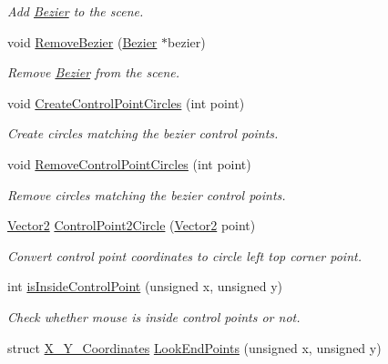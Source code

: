 \begin{DoxyCompactItemize}
\begin{DoxyCompactList}\small\item\em Add \mbox{\hyperlink{classBezier}{Bezier}} to the scene. \end{DoxyCompactList}\item 
void \mbox{\hyperlink{classOwnGraphicsScene_a24d8270608b0bd56c6155d99d7722ab8}{Remove\+Bezier}} (\mbox{\hyperlink{classBezier}{Bezier}} $\ast$bezier)
\begin{DoxyCompactList}\small\item\em Remove \mbox{\hyperlink{classBezier}{Bezier}} from the scene. \end{DoxyCompactList}\item 
void \mbox{\hyperlink{classOwnGraphicsScene_a0ad50d478944ef3200d1c59ddcf973a5}{Create\+Control\+Point\+Circles}} (int point)
\begin{DoxyCompactList}\small\item\em Create circles matching the bezier control points. \end{DoxyCompactList}\item 
void \mbox{\hyperlink{classOwnGraphicsScene_ad6ad8eaab22c10b1a228f08d8bd5bb68}{Remove\+Control\+Point\+Circles}} (int point)
\begin{DoxyCompactList}\small\item\em Remove circles matching the bezier control points. \end{DoxyCompactList}\item 
\mbox{\hyperlink{classVector2}{Vector2}} \mbox{\hyperlink{classOwnGraphicsScene_abc2de254d3e34b716eb36e33e0486f33}{Control\+Point2\+Circle}} (\mbox{\hyperlink{classVector2}{Vector2}} point)
\begin{DoxyCompactList}\small\item\em Convert control point coordinates to circle left top corner point. \end{DoxyCompactList}\item 
int \mbox{\hyperlink{classOwnGraphicsScene_ab8e0992d026eaeeda434d659c9c18a46}{is\+Inside\+Control\+Point}} (unsigned x, unsigned y)
\begin{DoxyCompactList}\small\item\em Check whether mouse is inside control points or not. \end{DoxyCompactList}\item 
struct \mbox{\hyperlink{structX__Y__Coordinates}{X\+\_\+\+Y\+\_\+\+Coordinates}} \mbox{\hyperlink{classOwnGraphicsScene_a17930b28f2c5cb7ed14440e44d667951}{Look\+End\+Points}} (unsigned x, unsigned y)

\end{DoxyCompactItemize}
